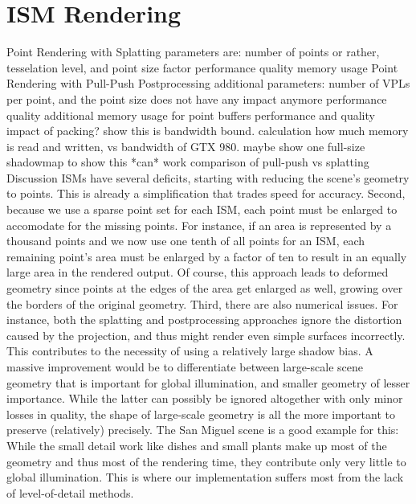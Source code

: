 \section{ISM Rendering}

\begin{outline}
\1 Point Rendering with Splatting
    \2 parameters are: number of points or rather, tesselation level, and point size factor
    \2 performance
    \2 quality
    \2 memory usage
\1 Point Rendering with Pull-Push Postprocessing
    \2 additional parameters: number of VPLs per point, and the point size does not have any impact anymore
    \2 performance
    \2 quality
    \2 additional memory usage for point buffers
    \2 performance and quality impact of packing?
    \2 show this is bandwidth bound. calculation how much memory is read and written, vs bandwidth of GTX 980.
    \2 maybe show one full-size shadowmap to show this *can* work
\1 comparison of pull-push vs splatting
\1 Discussion
    \2 ISMs have several deficits, starting with reducing the scene's geometry to points. This is already a simplification that trades speed for accuracy.
    \2 Second, because we use a sparse point set for each ISM, each point must be enlarged to accomodate for the missing points. For instance, if an area is represented by a thousand points and we now use one tenth of all points for an ISM, each remaining point's area must be enlarged by a factor of ten to result in an equally large area in the rendered output. Of course, this approach leads to deformed geometry since points at the edges of the area get enlarged as well, growing over the borders of the original geometry.
    \2 Third, there are also numerical issues. For instance, both the splatting and postprocessing approaches ignore the distortion caused by the projection, and thus might render even simple surfaces incorrectly. This contributes to the necessity of using a relatively large shadow bias.
    \2 A massive improvement would be to differentiate between large-scale scene geometry that is important for global illumination, and smaller geometry of lesser importance. While the latter can possibly be ignored altogether with only minor losses in quality, the shape of large-scale geometry is all the more important to preserve (relatively) precisely.
    \2 The San Miguel scene is a good example for this: While the small detail work like dishes and small plants make up most of the geometry and thus most of the rendering time, they contribute only very little to global illumination. This is where our implementation suffers most from the lack of level-of-detail methods.
\end{outline}



